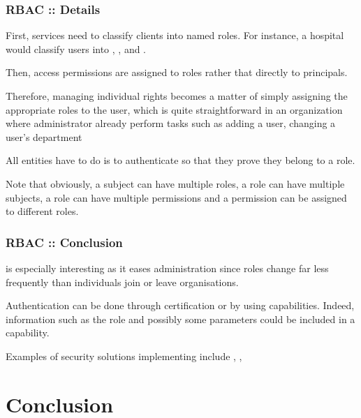 \begin{frame}
  \frametitle{RBAC :: Details}

  First, services need to classify clients into named roles. For instance,
  a hospital would classify users into , ,
   and .

  \-

  Then, access permissions are assigned to roles rather that directly to
  principals.

  \-

  Therefore, managing individual rights becomes a matter of simply assigning
  the appropriate roles to the user, which is quite straightforward in
  an organization where administrator already perform tasks such as adding
  a user, changing a user's department \etc{}

  \-

  All entities have to do is to authenticate so that they prove they belong
  to a role.

  \-

  Note that obviously, a subject can have multiple roles, a role can have
  multiple subjects, a role can have multiple permissions and a permission
  can be assigned to different roles.
\end{frame}


\begin{frame}
  \frametitle{RBAC :: Conclusion}

   is especially interesting as it eases administration since
  roles change far less frequently than individuals join or leave
  organisations.

  \-

  Authentication can be done through certification or by using capabilities.
  Indeed,  information such as the role and possibly some
  parameters could be included in a capability.

  \-

  Examples of security solutions implementing  include
  , ,  \etc{}
\end{frame}

%
%

\section{Conclusion}


